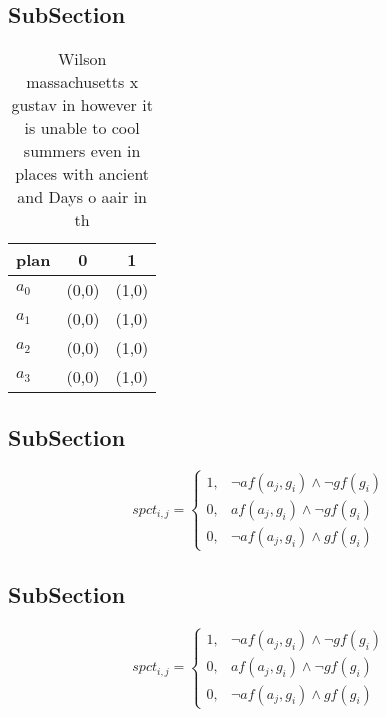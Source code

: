 \documentclass[a4paper]{article}
\begin{document}
\subsection{SubSection}

\begin{table}
\begin{adjustbox}{width=0.7\columnwidth}
\begin{tabular}{|l|l|l|}
\hline
\textbf{plan} & \multicolumn{1}{c|}{\textbf{0}} & \multicolumn{1}{c|}{\textbf{1}} \\ \hline
\textbf{$a_0$}  & (0,0) & (1,0) \\ \hline
\textbf{$a_1$}  & (0,0) & (1,0) \\ \hline
\textbf{$a_2$}  & (0,0) & (1,0) \\ \hline
\textbf{$a_3$}  & (0,0) & (1,0) \\ \hline
\end{tabular}
\end{adjustbox}
\caption{Wilson massachusetts x gustav in however it is unable to cool summers even in places with ancient and Days o aair in th
}
\end{table}

\subsection{SubSection}

\begin{equation}
spct_{i,j} =
\begin{cases}
1, & \text{$\neg af(a_j,g_i) \wedge \neg gf(g_i)$}\\
0, & \text{$af(a_j,g_i) \wedge \neg gf(g_i)$}\\
0, & \text{$\neg af(a_j,g_i) \wedge gf(g_i)$}
\end{cases}
\end{equation}

\subsection{SubSection}

\begin{equation}
spct_{i,j} =
\begin{cases}
1, & \text{$\neg af(a_j,g_i) \wedge \neg gf(g_i)$}\\
0, & \text{$af(a_j,g_i) \wedge \neg gf(g_i)$}\\
0, & \text{$\neg af(a_j,g_i) \wedge gf(g_i)$}
\end{cases}
\end{equation}
\end{document}
